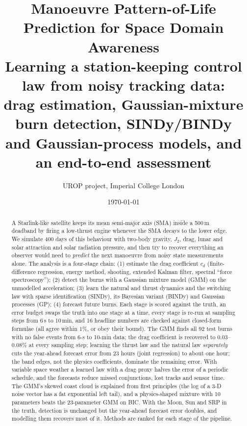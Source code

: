 \documentclass[11pt,a4paper]{article}
\title{\textbf{Manoeuvre Pattern-of-Life Prediction for Space Domain Awareness}\\[4pt]
\large Learning a station-keeping control law from noisy tracking data:\\ drag estimation, Gaussian-mixture
burn detection, SINDy/BINDy and Gaussian-process models, and an end-to-end assessment}
\author{UROP project, Imperial College London}
\date{\today}
\begin{document}
\maketitle
\begin{abstract}
\noindent A Starlink-like satellite keeps its mean semi-major axis (SMA) inside a 500\,m deadband by firing a
low-thrust engine whenever the SMA decays to the lower edge. We simulate 400 days of this behaviour with
two-body gravity, $J_2$, drag, lunar and solar attraction and solar radiation pressure, and then try to recover
everything an observer would need to \emph{predict} the next manoeuvre from noisy state measurements alone.
The analysis is a four-stage chain: (1) estimate the drag coefficient $c_d$ (finite-difference regression,
energy method, shooting, extended Kalman filter, spectral ``force spectroscopy''); (2) detect the burns with a
Gaussian mixture model (GMM) on the unmodelled acceleration; (3) learn the natural and thrust dynamics and the
switching law with sparse identification (SINDy), its Bayesian variant (BINDy) and Gaussian processes (GP);
(4) forecast future burns. Each stage is scored against the truth, an error budget swaps the truth into one
stage at a time, every stage is re-run at sampling steps from 6\,s to 10\,min, and 16 headline numbers are
checked against closed-form formulae (all agree within 1\%, or obey their bound). The GMM finds all 92 test
burns with no false events from 6-s to 10-min data; the drag coefficient is recovered to 0.03--0.08\% at every
sampling step; learning the thrust law and the natural law \emph{separately} cuts the year-ahead forecast error
from 23 hours (joint regression) to about one hour; the band edges, not the physics coefficients, dominate the
remaining error. With variable space weather a learned law with a drag proxy halves the error of a periodic
schedule, and the forecasts reduce missed conjunctions, lost tracks and sensor time. The GMM's skewed coast cloud is
explained from first principles (the log of a 3-D noise vector has a fat exponential left tail), and a physics-shaped
mixture with 10 parameters beats the 23-parameter GMM on BIC. With the Moon, Sun and SRP in the truth, detection is
unchanged but the year-ahead forecast error doubles, and modelling them recovers most of it. Methods are ranked for
each stage of the pipeline.
\end{abstract}

\tableofcontents
\newpage

\end{document}
